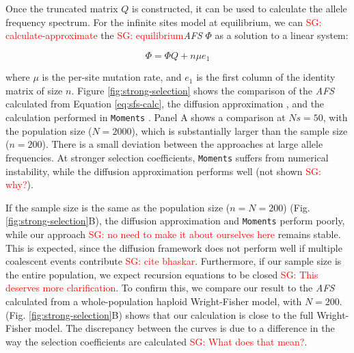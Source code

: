 \documentclass[review]{elsarticle}
\newcommand{\sgcomment}[1]{\textcolor{red}{SG: #1}}
\begin{document}
Once the truncated matrix $Q$ is constructed, it can be used to calculate the allele frequency
spectrum. For the infinite sites model at equilibrium, we can \sgcomment{calculate-approximate} the \sgcomment{equilibrium}\textit{AFS} $\Phi$ as a
solution to a linear system:

\begin{equation}
  \label{eq:sfs-calc}
  \Phi = \Phi Q + n \mu e_1
\end{equation}

where $\mu$ is the per-site mutation rate, and $e_1$ is the first column of the identity matrix of
size $n$. Figure \ref{fig:strong-selection} shows the comparison of the \textit{AFS} calculated from
Equation \eqref{eq:sfs-calc}, the diffusion approximation \cite[eq. 9.23]{Ewens2004}, and the
calculation performed in \texttt{Moments} \citep{JouganousEtAl2017}. Panel A shows a comparison at
$Ns=50$, with the population size ($N=2000$), which is substantially larger than the sample size
($n=200$). There is a small deviation between the approaches at large allele frequencies. At
stronger selection coefficients, \texttt{Moments} suffers from numerical instability, while the
diffusion approximation performs well (not shown \sgcomment{why?}).

If the sample size is the same as the population size ($n=N=200$) (Fig.
\ref{fig:strong-selection}B), the diffusion approximation and \texttt{Moments} perform poorly, while
our approach \sgcomment{no need to make it about ourselves here} remains stable. This is expected, since the diffusion framework does not perform well
if multiple coalescent events contribute \sgcomment{cite bhaskar}. Furthermore, if our sample size is the entire population,
we expect recursion equations to be closed \sgcomment{This deserves more clarification}. To confirm this, we compare our result to the
\textit{AFS} calculated from a whole-population haploid Wright-Fisher model, with $N=200$. (Fig.
\ref{fig:strong-selection}B) shows that our calculation is close to the full Wright-Fisher model.
The discrepancy between the curves is due to a difference in the way the selection coefficients are
calculated \sgcomment{What does that mean?}.
\end{document}
